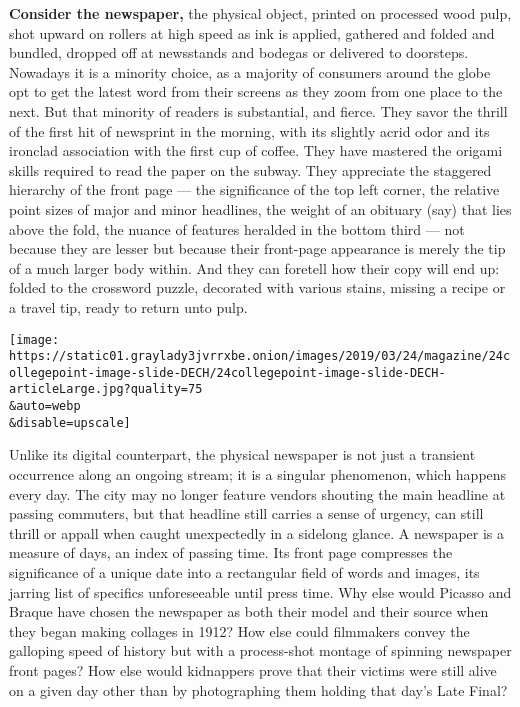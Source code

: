 \textbf{Consider the newspaper,} the physical object, printed on
processed wood pulp, shot upward on rollers at high speed as ink is
applied, gathered and folded and bundled, dropped off at newsstands and
bodegas or delivered to doorsteps. Nowadays it is a minority choice, as
a majority of consumers around the globe opt to get the latest word from
their screens as they zoom from one place to the next. But that minority
of readers is substantial, and fierce. They savor the thrill of the
first hit of newsprint in the morning, with its slightly acrid odor and
its ironclad association with the first cup of coffee. They have
mastered the origami skills required to read the paper on the subway.
They appreciate the staggered hierarchy of the front page --- the
significance of the top left corner, the relative point sizes of major
and minor headlines, the weight of an obituary (say) that lies above the
fold, the nuance of features heralded in the bottom third --- not
because they are lesser but because their front-page appearance is
merely the tip of a much larger body within. And they can foretell how
their copy will end up: folded to the crossword puzzle, decorated with
various stains, missing a recipe or a travel tip, ready to return unto
pulp.

\texttt{[image: https://static01.graylady3jvrrxbe.onion/images/2019/03/24/magazine/24collegepoint-image-slide-DECH/24collegepoint-image-slide-DECH-articleLarge.jpg?quality=75\\\&auto=webp\\\&disable=upscale]}

Unlike its digital counterpart, the physical newspaper is not just a
transient occurrence along an ongoing stream; it is a singular
phenomenon, which happens every day. The city may no longer feature
vendors shouting the main headline at passing commuters, but that
headline still carries a sense of urgency, can still thrill or appall
when caught unexpectedly in a sidelong glance. A newspaper is a measure
of days, an index of passing time. Its front page compresses the
significance of a unique date into a rectangular field of words and
images, its jarring list of specifics unforeseeable until press time.
Why else would Picasso and Braque have chosen the newspaper as both
their model and their source when they began making collages in 1912?
How else could filmmakers convey the galloping speed of history but with
a process-shot montage of spinning newspaper front pages? How else would
kidnappers prove that their victims were still alive on a given day
other than by photographing them holding that day's Late Final?

